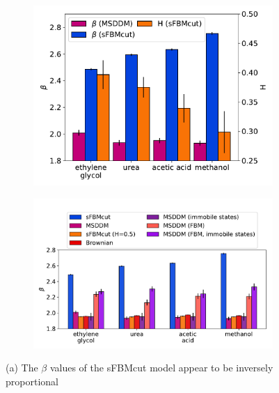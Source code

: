 \documentclass[12pt]{article}
\begin{document}
  \begin{figure}
  \centering
  \begin{subfigure}{0.43\textwidth}
  \includegraphics[width=\textwidth]{beta_hurst.pdf}
  \caption{}\label{fig:beta_hurst}
  \end{subfigure}
  \begin{subfigure}{0.52\textwidth}
  \includegraphics[width=\textwidth]{beta_parameters.pdf}
  \caption{}\label{fig:beta_parameters}
  \end{subfigure}
  \caption{(a) The $\beta$ values of the sFBMcut model appear to be inversely proportional
}
\end{figure}
\end{document}
